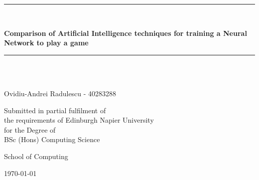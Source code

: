 \newcommand{\HRule}{\rule{\linewidth}{0.5mm}}

\begin{titlepage}
	\begin{center}

	\HRule \\[0.4cm]
    	{\Large \bfseries Comparison of Artificial Intelligence techniques for training a Neural Network to play a game\par}
	\vspace{0.2cm}
	\HRule \\[1.5cm]

	
    	\vspace{3cm}
	\begin{minipage}{0.4\textwidth}
	\begin{center} \large
        \emph{}\\
        	Ovidiu-Andrei Radulescu - 40283288
				
   	 \end{center}
    	\end{minipage}
	
	\vspace{2cm}
    	\begin{minipage}{1\textwidth}
    	\begin{center} \large
        
		Submitted in partial fulfilment of \\
		the requirements of Edinburgh Napier University \\
		for the Degree of \\
        	BSc (Hons) Computing Science
    	\end{center}
    	\end{minipage}

    	\vfill

	\begin{minipage}{1\textwidth}
    	\begin{center} \large
		School of Computing
    	\end{center}
    	\end{minipage}
	
	\vspace{1cm}
    	{\large \today}


	\end{center}
\end{titlepage}
